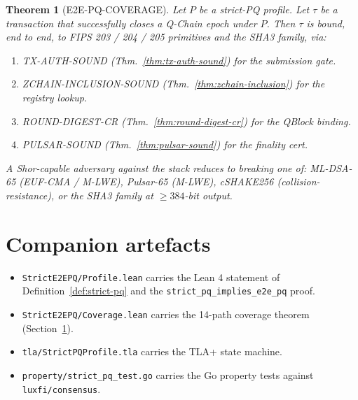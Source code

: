 \documentclass[11pt,a4paper]{article}
\newtheorem{theorem}{Theorem}
\begin{document}
\begin{theorem}[E2E-PQ-COVERAGE]
\label{thm:e2e-coverage}
Let $P$ be a strict-PQ profile. Let $\tau$ be a transaction that
successfully closes a Q-Chain epoch under $P$. Then $\tau$ is bound, end
to end, to FIPS 203 / 204 / 205 primitives and the SHA3 family, via:
\begin{enumerate}[leftmargin=2em,nosep]
  \item TX-AUTH-SOUND (Thm.~\ref{thm:tx-auth-sound}) for the
    submission gate.
  \item ZCHAIN-INCLUSION-SOUND (Thm.~\ref{thm:zchain-inclusion}) for
    the registry lookup.
  \item ROUND-DIGEST-CR (Thm.~\ref{thm:round-digest-cr}) for the
    QBlock binding.
  \item PULSAR-SOUND (Thm.~\ref{thm:pulsar-sound}) for the
    finality cert.
\end{enumerate}
A Shor-capable adversary against the stack reduces to breaking one of:
ML-DSA-65 (EUF-CMA / M-LWE), Pulsar-65 (M-LWE), cSHAKE256
(collision-resistance), or the SHA3 family at $\ge 384$-bit output.
\end{theorem}

\section{Companion artefacts}

\begin{itemize}[leftmargin=2em,nosep]
  \item \texttt{StrictE2EPQ/Profile.lean} carries the Lean 4 statement of
    Definition~\ref{def:strict-pq} and the
    \texttt{strict\_pq\_implies\_e2e\_pq} proof.
  \item \texttt{StrictE2EPQ/Coverage.lean} carries the 14-path coverage
    theorem (Section~\ref{thm:e2e-coverage}).
  \item \texttt{tla/StrictPQProfile.tla} carries the TLA+ state machine.
  \item \texttt{property/strict\_pq\_test.go} carries the Go property
    tests against \texttt{luxfi/consensus}.
\end{itemize}
\end{document}
